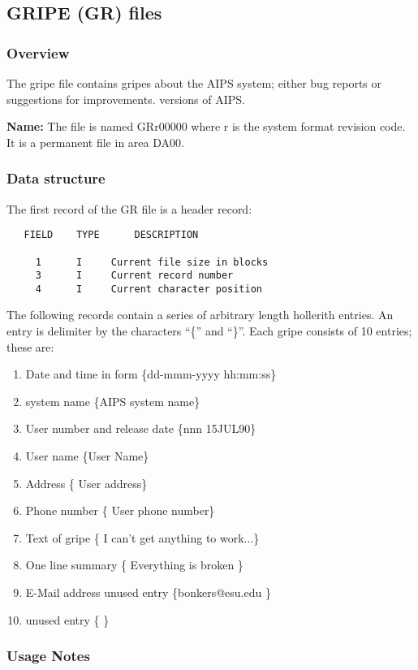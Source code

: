 \subsection{GRIPE (GR) files }
\subsubsection{Overview}

  The gripe file contains gripes about the AIPS system; either bug
reports or suggestions for improvements.
versions of AIPS.

{\bf Name:}  The file is named GRr00000 where r is the system format revision
code.  It is a permanent file in area DA00.

\subsubsection{Data structure}
   The first record of the GR file is a header record:
\begin{verbatim}
   FIELD    TYPE      DESCRIPTION

     1      I     Current file size in blocks
     3      I     Current record number
     4      I     Current character position

\end{verbatim}
   The following records contain a series of arbitrary length
hollerith entries.  An entry is delimiter by the characters ``\{'' and
``\}''.  Each gripe consists of 10 entries; these are:
\begin{enumerate}
\item Date and time in form \{dd-mmm-yyyy hh:mm:ss\}
\item system name \{AIPS system name\}
\item User number and release date \{nnn  15JUL90\}
\item User name \{User Name\}
\item Address \{ User address\}
\item Phone number \{ User phone number\}
\item Text of gripe \{ I can't get anything to work...\}
\item One line summary \{ Everything is broken \}
\item E-Mail address unused entry \{bonkers@esu.edu \}
\item unused entry \{ \}
\end{enumerate}

\subsubsection{Usage Notes}

